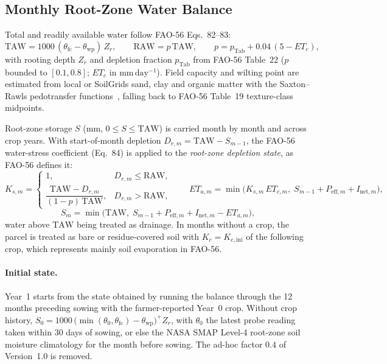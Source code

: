 \subsection{Monthly Root-Zone Water Balance}
Total and readily available water follow FAO-56 Eqs.~82--83:
\begin{equation}
  \mathrm{TAW} = 1000\,(\theta_{\mathrm{fc}} - \theta_{\mathrm{wp}})\, Z_r, \qquad
  \mathrm{RAW} = p\,\mathrm{TAW}, \qquad p = p_{\mathrm{Tab}} + 0.04\,(5 - ET_c),
\end{equation}
with rooting depth $Z_r$ and depletion fraction $p_{\mathrm{Tab}}$ from FAO-56 Table~22 ($p$ bounded to $[0.1, 0.8]$; $ET_c$ in $\mathrm{mm\,day^{-1}}$). Field capacity and wilting point are estimated from local or SoilGrids sand, clay and organic matter with the Saxton--Rawls pedotransfer functions~\cite{saxton2006soil}, falling back to FAO-56 Table~19 texture-class midpoints.

Root-zone storage $S$ (mm, $0 \le S \le \mathrm{TAW}$) is carried month by month and across crop years. With start-of-month depletion $D_{r,m} = \mathrm{TAW} - S_{m-1}$, the FAO-56 water-stress coefficient (Eq.~84) is applied to the \emph{root-zone depletion state}, as FAO-56 defines it:
\begin{equation}
  K_{s,m} =
  \begin{cases}
    1, & D_{r,m} \le \mathrm{RAW}, \\[4pt]
    \dfrac{\mathrm{TAW} - D_{r,m}}{(1 - p)\,\mathrm{TAW}}, & D_{r,m} > \mathrm{RAW},
  \end{cases}
  \qquad
  ET_{a,m} = \min\!\bigl(K_{s,m}\, ET_{c,m},\; S_{m-1} + P_{\mathrm{eff},m} + I_{\mathrm{net},m}\bigr),
\end{equation}
\begin{equation}
  S_m = \min\!\bigl(\mathrm{TAW},\; S_{m-1} + P_{\mathrm{eff},m} + I_{\mathrm{net},m} - ET_{a,m}\bigr),
\end{equation}
water above $\mathrm{TAW}$ being treated as drainage. In months without a crop, the parcel is treated as bare or residue-covered soil with $K_{c} = K_{c,\mathrm{ini}}$ of the following crop, which represents mainly soil evaporation in FAO-56.

\paragraph{Initial state.} Year~1 starts from the state obtained by running the balance through the 12 months preceding sowing with the farmer-reported Year~0 crop. Without crop history, $S_0 = 1000\,\bigl(\min(\theta_0, \theta_{\mathrm{fc}}) - \theta_{\mathrm{wp}}\bigr)^+ Z_r$, with $\theta_0$ the latest probe reading taken within 30 days of sowing, or else the NASA SMAP Level-4 root-zone soil moisture climatology for the month before sowing. The ad-hoc factor $0.4$ of Version~1.0 is removed.

